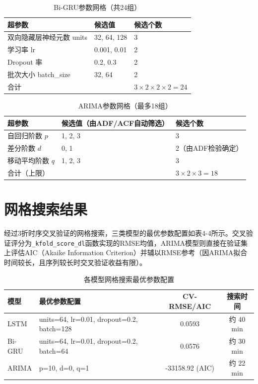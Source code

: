 \documentclass[12pt,a4paper,oneside]{ctexbook}
\begin{document}
	\begin{table}[H]
		\centering
		\caption{Bi-GRU参数网格（共24组）}
		\label{tab:bigru_grid}
		\begin{tabular}{lll}
			\toprule
			超参数 & 候选值 & 候选个数 \\
			\midrule
			双向隐藏层神经元数 units & 32, 64, 128 & 3 \\
			学习率 lr              & 0.001, 0.01 & 2 \\
			Dropout 率             & 0.2, 0.3    & 2 \\
			批次大小 batch\_size    & 32, 64      & 2 \\
			\midrule
			\multicolumn{2}{l}{合计} & $3\times2\times2\times2=24$ \\
			\bottomrule
		\end{tabular}
	\end{table}
	
	\begin{table}[H]
		\centering
		\caption{ARIMA参数网格（最多18组）}
		\label{tab:arima_grid}
		\begin{tabular}{lll}
			\toprule
			超参数 & 候选值（由ADF/ACF自动筛选） & 候选个数 \\
			\midrule
			自回归阶数 $p$ & 1, 2, 3 & 3 \\
			差分阶数 $d$   & 0, 1    & 2（由ADF检验确定） \\
			移动平均阶数 $q$ & 1, 2, 3 & 3 \\
			\midrule
			\multicolumn{2}{l}{合计（上限）} & $3\times2\times3=18$ \\
			\bottomrule
		\end{tabular}
	\end{table}
	
	\section{网格搜索结果}
	
	经过3折时序交叉验证的网格搜索，三类模型的最优参数配置如表4-4所示。交叉验证评分为\texttt{\_kfold\_score\_dl}函数实现的RMSE均值，ARIMA模型则直接在验证集上评估AIC（Akaike Information Criterion）并辅以RMSE参考（因ARIMA拟合时间较长，且序列较长时交叉验证收益有限）。
	
	\begin{table}[H]
		\centering
		\caption{各模型网格搜索最优参数配置}
		\label{tab:best_params}
		\begin{tabular}{llcc}
			\toprule
			模型 & 最优参数配置 & CV-RMSE/AIC & 搜索时间 \\
			\midrule
			LSTM   & units=64, lr=0.01, dropout=0.2, batch=128 & 0.0593 & 约 40 min \\
			Bi-GRU & units=64, lr=0.01, dropout=0.2, batch=64  & 0.0576 & 约 30 min \\
			ARIMA  & p=10, d=0, q=1                              & -33158.92 (AIC) & 约 22 min \\
			\bottomrule
		\end{tabular}
	\end{table}
	
\end{document}

